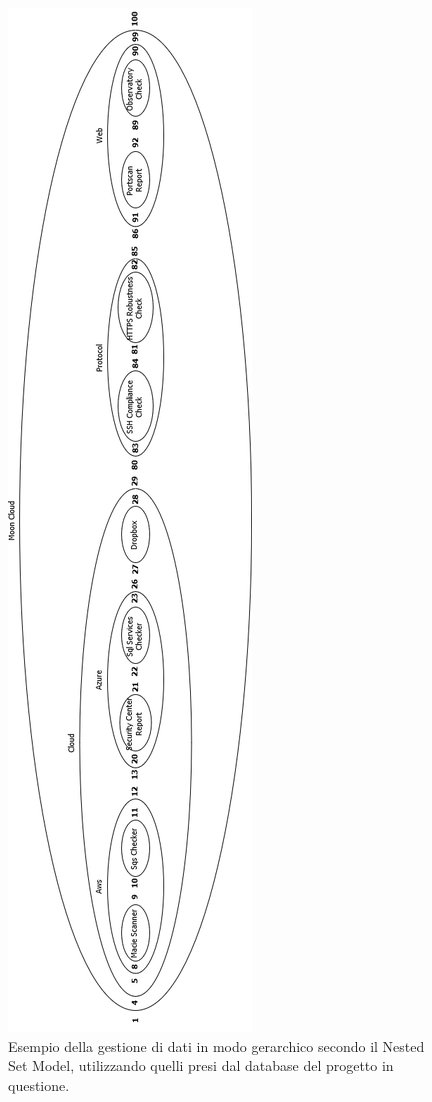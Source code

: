 \begin{figure}
    \centering
    \includegraphics[scale=0.56]{images/MC_Rec_NSM_Container.png}
    \caption{Esempio della gestione di dati in modo gerarchico secondo il Nested Set Model, utilizzando quelli presi dal database del 
    progetto in questione.}
    \label{fig:MC_Rec_NSM_Container}
\end{figure}
%
\newpage
%
